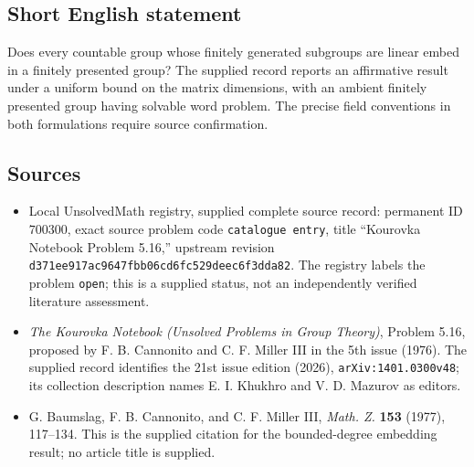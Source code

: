 \documentclass[11pt]{article}
\begin{document}
\subsection{Short English statement}
Does every countable group whose finitely generated subgroups are linear embed in a finitely presented group? The supplied record reports an affirmative result under a uniform bound on the matrix dimensions, with an ambient finitely presented group having solvable word problem. The precise field conventions in both formulations require source confirmation.
\subsection{Sources}
\begin{itemize}
\item Local UnsolvedMath registry, supplied complete source record: permanent ID \(700300\), exact source problem code \texttt{catalogue entry}, title ``Kourovka Notebook Problem 5.16,'' upstream revision \texttt{d371ee917ac9647fbb06cd6fc529deec6f3dda82}. The registry labels the problem \texttt{open}; this is a supplied status, not an independently verified literature assessment.
\item \emph{The Kourovka Notebook (Unsolved Problems in Group Theory)}, Problem 5.16, proposed by F. B. Cannonito and C. F. Miller III in the 5th issue (1976). The supplied record identifies the 21st issue edition (2026), \texttt{arXiv:1401.0300v48}; its collection description names E. I. Khukhro and V. D. Mazurov as editors.
\item G. Baumslag, F. B. Cannonito, and C. F. Miller III, \emph{Math. Z.} \textbf{153} (1977), 117--134. This is the supplied citation for the bounded-degree embedding result; no article title is supplied.
\end{itemize}
\end{document}
